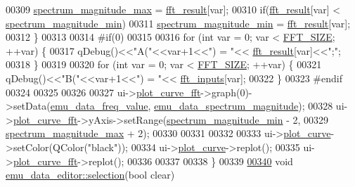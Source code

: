 \begin{DoxyCode}
00309              \hyperlink{a00004_ae0119c7dd2179cdcb3ea37adbefdc289}{spectrum\_magnitude\_max} = \hyperlink{a00004_a63b6150bfbba86ba943877a2f547ddd8}{fft\_result}[var];
00310          \textcolor{keywordflow}{if}(\hyperlink{a00004_a63b6150bfbba86ba943877a2f547ddd8}{fft\_result}[var] < \hyperlink{a00004_afb692cc49c350d4bf120ca1e3dd61e93}{spectrum\_magnitude\_min})
00311              \hyperlink{a00004_afb692cc49c350d4bf120ca1e3dd61e93}{spectrum\_magnitude\_min} = \hyperlink{a00004_a63b6150bfbba86ba943877a2f547ddd8}{fft\_result}[var];
00312      \}
00313 
00314 \textcolor{preprocessor}{#if(0)}
00315 
00316      \textcolor{keywordflow}{for} (\textcolor{keywordtype}{int} var = 0; var < \hyperlink{a00036_a636ddc19af00bc87969a07c88331f105}{FFT\_SIZE}; ++var) \{
00317           qDebug()<<\textcolor{stringliteral}{"A("}<<var+1<<\textcolor{stringliteral}{") = "}<< \hyperlink{a00004_a63b6150bfbba86ba943877a2f547ddd8}{fft\_result}[var]<<\textcolor{stringliteral}{";"};
00318      \}
00319 
00320      \textcolor{keywordflow}{for} (\textcolor{keywordtype}{int} var = 0; var < \hyperlink{a00036_a636ddc19af00bc87969a07c88331f105}{FFT\_SIZE}; ++var) \{
00321           qDebug()<<\textcolor{stringliteral}{"B("}<<var+1<<\textcolor{stringliteral}{") = "}<< \hyperlink{a00004_a8782fc20094d65d56c04869b9692902e}{fft\_inputs}[var];
00322      \}
00323 \textcolor{preprocessor}{#endif}
00324 
00325 
00326 
00327      ui->\hyperlink{a00026_a2bdf46ca3b702151408e6f6bd96b3228}{plot\_curve\_fft}->graph(0)->setData(\hyperlink{a00004_a62129d59e218ab857cd50cb202205129}{emu\_data\_freq\_value},
      \hyperlink{a00004_ac3c515466f79ab8e60a58e8d15a3b991}{emu\_data\_spectrum\_magnitude});
00328      ui->\hyperlink{a00026_a2bdf46ca3b702151408e6f6bd96b3228}{plot\_curve\_fft}->yAxis->setRange(\hyperlink{a00004_afb692cc49c350d4bf120ca1e3dd61e93}{spectrum\_magnitude\_min} - 2,
00329                                          \hyperlink{a00004_ae0119c7dd2179cdcb3ea37adbefdc289}{spectrum\_magnitude\_max} + 2);
00330 
00331 
00332 
00333      ui->\hyperlink{a00026_a1d46308dee8db7e3c99af65f13055479}{plot\_curve}->setColor(QColor(\textcolor{stringliteral}{"black"}));
00334      ui->\hyperlink{a00026_a1d46308dee8db7e3c99af65f13055479}{plot\_curve}->replot();
00335      ui->\hyperlink{a00026_a2bdf46ca3b702151408e6f6bd96b3228}{plot\_curve\_fft}->replot();
00336 
00337 
00338 \}
00339 
\hypertarget{a00035_source_l00340}{}\hyperlink{a00004_a86f994dedec393af88b5d1a37b1e30b5}{00340} \textcolor{keywordtype}{void} \hyperlink{a00004_a86f994dedec393af88b5d1a37b1e30b5}{emu\_data\_editor::selection}(\textcolor{keywordtype}{bool} clear)

\end{DoxyCode}
